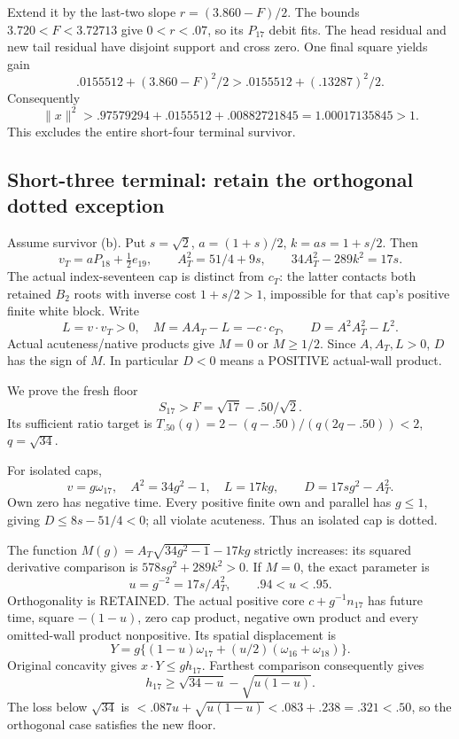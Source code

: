 \documentclass[11pt]{article}
\theoremstyle{definition}
\theoremstyle{remark}
\begin{document}
Extend it by the last-two slope
\(r=(3.860-F)/2\).
The bounds \(3.720<F<3.72713\)
give \(0<r<.07\), so its
\(P_{17}\) debit fits.
The head residual and new tail
residual have disjoint support
and cross zero.
One final square yields gain
\[
             .0155512+(3.860-F)^2/2
                     >.0155512+(.13287)^2/2 .
\]
Consequently
\[
                         \|x\|^2>
 .97579294+.0155512+.00882721845=1.00017135845>1 .
\]
This excludes the entire
short-four terminal survivor.

\subsection{Short-three terminal: retain the orthogonal dotted exception}
\label{app:exact19:Bshortthreefloor}

Assume survivor (b).
Put \(s=\sqrt2\), \(a=(1+s)/2\),
\(k=as=1+s/2\).
Then
\[
 v_T=aP_{18}+\tfrac12e_{19},\qquad
 A_T^2=51/4+9s,\qquad
                         34A_T^2-289k^2=17s .
\]
The actual index-seventeen cap
is distinct from \(c_T\): the
latter contacts both retained
\(B_2\) roots with inverse cost
\(1+s/2>1\), impossible for that
cap's positive finite white block.
Write
\[
          L=v\cdot v_T>0,\quad M=AA_T-L=-c\cdot c_T,\qquad
                    D=A^2A_T^2-L^2 .
\]
Actual acuteness/native products
give \(M=0\) or \(M\ge1/2\).
Since \(A,A_T,L>0\), \(D\) has
the sign of \(M\).
In particular \(D<0\) means a
POSITIVE actual-wall product.

We prove the fresh floor
\[
                          S_{17}>F=\sqrt{17}-.50/\sqrt2 .
\tag{B19F50}\label{app:exact19:eq:BF50}
\]
Its sufficient ratio target is
\(T_{.50}(q)=2-(q-.50)/(q(2q-.50))<2\),
\(q=\sqrt{34}\).

For isolated caps,
\[
 v=g\omega_{17},\quad A^2=34g^2-1,\quad
             L=17kg,\qquad D=17sg^2-A_T^2 .
\]
Own zero has negative time.
Every positive finite own and
parallel has \(g\le1\), giving
\(D\le8s-51/4<0\); all violate
acuteness.
Thus an isolated cap is dotted.

The function
\(M(g)=A_T\sqrt{34g^2-1}-17kg\)
strictly increases:
its squared derivative comparison is
\(578sg^2+289k^2>0\).
If \(M=0\), the exact parameter is
\[
                          u=g^{-2}=17s/A_T^2,\qquad .94<u<.95 .
\]
Orthogonality is RETAINED.
The actual positive core
\(c+g^{-1}n_{17}\) has future time,
square \(-(1-u)\), zero cap
product, negative own product
and every omitted-wall product
nonpositive.
Its spatial displacement is
\[
 Y=g\{(1-u)\omega_{17}
                  +(u/2)(\omega_{16}+\omega_{18})\}.
\]
Original concavity gives
\(x\cdot Y\le g h_{17}\).
Farthest comparison consequently
gives
\[
                 h_{17}\ge\sqrt{34-u}-\sqrt{u(1-u)} .
\]
The loss below \(\sqrt{34}\) is
\(<.087u+\sqrt{u(1-u)}
<.083+.238=.321<.50\),
so the orthogonal case satisfies
the new floor.
\end{document}
